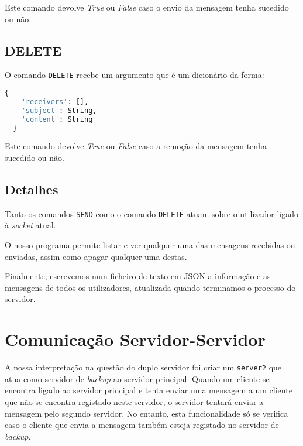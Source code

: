 \documentclass[12pt]{article}
\begin{document}
Este comando devolve \textit{True} ou \textit{False} caso o envio da
mensagem tenha sucedido ou não.

\subsection{DELETE}
O comando \texttt{DELETE} recebe um argumento que é um dicionário da forma:

\vspace{2mm}
\begin{lstlisting}[language=Python]
  {
    'receivers': [],
    'subject': String,
    'content': String
  }
\end{lstlisting}

Este comando devolve \textit{True} ou \textit{False} caso a remoção da
mensagem tenha sucedido ou não.

\subsection{Detalhes}
Tanto os comandos \texttt{SEND} como o comando \texttt{DELETE} atuam sobre o utilizador
ligado à \textit{socket} atual.

O nosso programa permite listar e ver qualquer uma das mensagens recebidas ou
enviadas, assim como apagar qualquer uma destas.

Finalmente, escrevemos num ficheiro de texto em JSON a informação e as mensagens
de todos os utilizadores, atualizada quando terminamos o processo do servidor.

\section{Comunicação Servidor-Servidor}
A nossa interpretação na questão do duplo servidor foi criar um \texttt{server2}
que atua como servidor de \textit{backup} ao servidor principal. Quando um cliente
se encontra ligado ao servidor principal e tenta enviar uma mensagem a um cliente
que não se encontra registado neste servidor, o servidor tentará enviar a mensagem
pelo segundo servidor. No entanto, esta funcionalidade só se verifica caso o cliente
que envia a mensagem também esteja registado no servidor de \textit{backup}.
\end{document}

